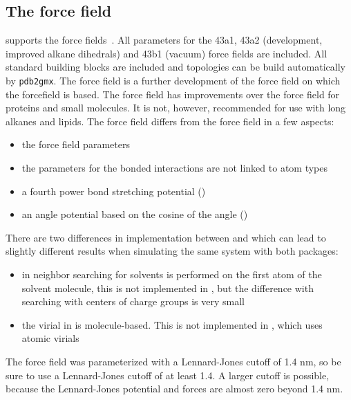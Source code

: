 \subsection{The  force field}
{\gromacs} supports the  force fields~\cite{gromos96}.
All parameters for the 43a1, 43a2 (development, improved alkane
dihedrals) and 43b1 (vacuum) force fields are included.  All standard
building blocks are included and topologies can be build automatically
by {\tt pdb2gmx}.  The  force field is a further
development of the  force field on which the {\gromacs}
forcefield is based. The  force field has improvements
over the {\gromacs} force field for proteins and small molecules.
It is not, however, recommended for use with long alkanes and
lipids.  The  force field differs from the {\gromacs}
force field in a few aspects:
\begin{itemize}
\item the force field parameters
\item the parameters for the bonded interactions are not linked to atom types
\item a fourth power bond stretching potential ()
\item an angle potential based on the cosine of the angle ()
\end{itemize}
There are two differences in implementation between {\gromacs} and 
which can lead to slightly different results when simulating the same system
with both packages: 
\begin{itemize}
\item in  neighbor searching for solvents is performed on the
first atom of the solvent molecule, this is not implemented in {\gromacs},
but the difference with searching with centers of charge groups is very small
\item the virial in  is molecule-based. This is not implemented in
{\gromacs}, which uses atomic virials
\end{itemize}
The  force field was parameterized with a Lennard-Jones cutoff
of 1.4 nm, so be sure to use a Lennard-Jones cutoff of at least 1.4.
A larger cutoff is possible, because the Lennard-Jones potential and forces
are almost zero beyond 1.4 nm.

